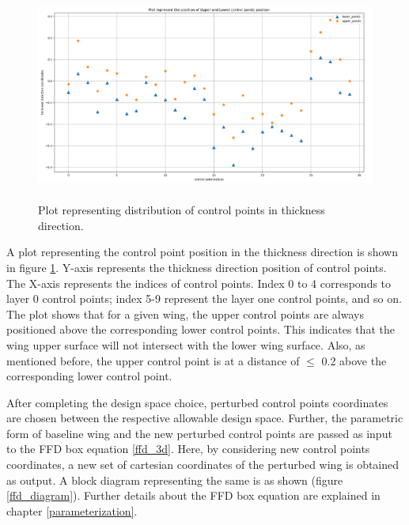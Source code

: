 \begin{figure}
    \centering
    \includegraphics[width=\textwidth, height=70mm]{figures/thickness_direction_plot.png}
    \caption{Plot representing distribution of control points in thickness direction.}
    \label{thickness_plot_control_point}
\end{figure}

A plot representing the control point position in the thickness direction is shown in figure \ref{thickness_plot_control_point}. Y-axis represents the thickness direction position of control points. The X-axis represents the indices of control points. Index 0 to 4 corresponds to layer 0 control points; index 5-9 represent the layer one control points, and so on. The plot shows that for a given wing, the upper control points are always positioned above the corresponding lower control points. This indicates that the wing upper surface will not intersect with the lower wing surface. Also, as mentioned before, the upper control point is at a distance of $\leq$ 0.2 above the corresponding lower control point.



After completing the design space choice, perturbed control points coordinates are chosen between the respective allowable design space. Further, the parametric form of baseline wing and the new perturbed control points are passed as input to the FFD box equation \ref{ffd_3d}. Here, by considering new control points coordinates, a new set of cartesian coordinates of the perturbed wing is obtained as output. A block diagram representing the same is as shown (figure \ref{ffd_diagram}). Further details about the FFD box equation are explained in chapter \ref{parameterization}.

